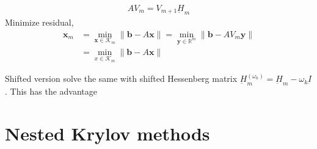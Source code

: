 \documentclass{article}
\begin{document}
 \begin{align*}
 AV_m = V_{m+1}\underbar{H}_m
 \end{align*}
 Minimize residual,
 \begin{align*}
 \mathbf{x}_m &= \min_{\mathbf{x} \in \mathcal{K}_m} \| \mathbf{b} - A \mathbf{x}\|
              = \min_{\mathbf{y} \in \mathbb{R}^m} \| \mathbf{b} - A V_m\mathbf{y}\| \\
              &= \min_{x \in \mathcal{K}_m} \| \mathbf{b} - A \mathbf{x}\|
 \end{align*}
 \cite{GL96}
 
 Shifted version \cite{F98} solve the same with shifted Hessenberg matrix $\underbar{H}_m^{(\omega_k)} = \underbar{H}_m - \omega_k \underbar{I}$. This has the advantage 
 \section{Nested Krylov methods}
 \cite{BG14}
 
 
\end{document}
